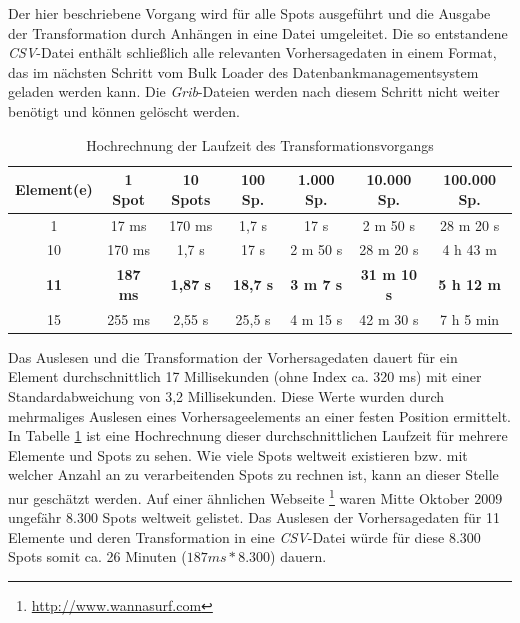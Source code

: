 

Der hier beschriebene Vorgang wird für alle Spots ausgeführt und die
Ausgabe der Transformation durch Anhängen in eine Datei
umgeleitet. Die so entstandene \textit{CSV}-Datei enthält schließlich
alle relevanten Vorhersagedaten in einem Format, das im nächsten
Schritt vom Bulk Loader des Datenbankmanagementsystem geladen werden
kann. Die \textit{Grib}-Dateien werden nach diesem Schritt nicht
weiter benötigt und können gelöscht werden.
\begin{table}[h]
  \centering
  {\sf
    \footnotesize
    \begin{longtable}{c|c|c|c|c|c|c}

      \toprule
      \textbf{Element(e)} & \textbf{1 Spot} & \textbf{10 Spots} & \textbf{100 Sp.} & \textbf{1.000 Sp.} & \textbf{10.000 Sp.} & \textbf{100.000 Sp.} \\
      \midrule
      1 & 17 ms & 170 ms & 1,7 s & 17 s & 2 m 50 s & 28 m 20 s \\
      10 & 170 ms & 1,7 s & 17 s & 2 m 50 s & 28 m 20 s & 4 h 43 m \\
      \textbf{11} & \textbf{187 ms} &  \textbf{1,87 s} & \textbf{18,7 s} & \textbf{3 m 7 s} & \textbf{31 m 10 s} & \textbf{5 h 12 m} \\
      15 & 255 ms & 2,55 s & 25,5 s & 4 m 15 s & 42 m 30 s &  7 h 5 min\\
      \bottomrule
    \end{longtable}
  }

  \caption{Hochrechnung der Laufzeit des Transformationsvorgangs}
  \label{tab:transformation_laufzeit}

\end{table}

Das Auslesen und die Transformation der Vorhersagedaten dauert für ein
Element durchschnittlich 17 Millisekunden (ohne Index ca. 320 ms) mit
einer Standardabweichung von 3,2 Millisekunden. Diese Werte wurden
durch mehrmaliges Auslesen eines Vorhersageelements an einer festen
Position ermittelt. In Tabelle \ref{tab:transformation_laufzeit} ist
eine Hochrechnung dieser durchschnittlichen Laufzeit für mehrere
Elemente und Spots zu sehen. Wie viele Spots weltweit existieren
bzw. mit welcher Anzahl an zu verarbeitenden Spots zu rechnen ist,
kann an dieser Stelle nur geschätzt werden. Auf einer ähnlichen
Webseite \footnote{\url{http://www.wannasurf.com}} waren Mitte Oktober
2009 ungefähr 8.300 Spots weltweit gelistet. Das Auslesen der
Vorhersagedaten für 11 Elemente und deren Transformation in eine
\textit{CSV}-Datei würde für diese 8.300 Spots somit ca. 26 Minuten
($187 ms * 8.300$) dauern.

